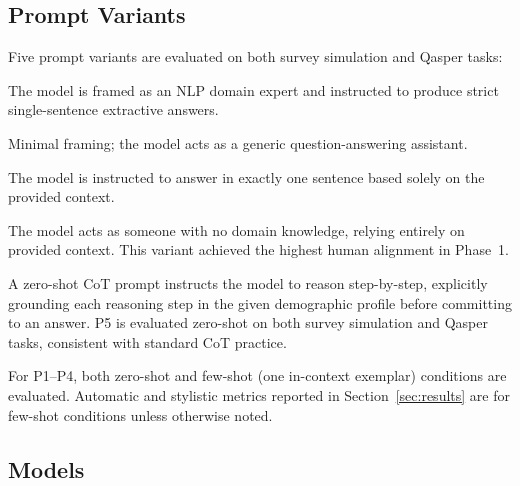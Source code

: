\documentclass[sigconf,nonacm]{acmart}
\begin{document}
\subsection{Prompt Variants}
\label{sec:method:prompts}

Five prompt variants are evaluated on both survey simulation and Qasper tasks:

\begin{description}[leftmargin=1.2em,itemsep=1pt]
\item[\textbf{P1 (Expert NLP).}] The model is framed as an NLP domain expert
  and instructed to produce strict single-sentence extractive answers.
\item[\textbf{P2 (Plain QA).}] Minimal framing; the model acts as a generic
  question-answering assistant.
\item[\textbf{P3 (Concise).}] The model is instructed to answer in exactly
  one sentence based solely on the provided context.
\item[\textbf{P4 (Novice Persona).}] The model acts as someone with no domain
  knowledge, relying entirely on provided context. This variant achieved the
  highest human alignment in Phase~1.
\item[\textbf{P5 (Chain-of-Thought).}] A zero-shot CoT prompt instructs the
  model to reason step-by-step, explicitly grounding each reasoning step in
  the given demographic profile before committing to an answer. P5 is
  evaluated zero-shot on both survey simulation and Qasper tasks, consistent
  with standard CoT practice.
\end{description}

For P1--P4, both zero-shot and few-shot (one in-context exemplar) conditions
are evaluated. Automatic and stylistic metrics reported in Section~\ref{sec:results}
are for few-shot conditions unless otherwise noted.

\subsection{Models}
\label{sec:method:models}
\end{document}
